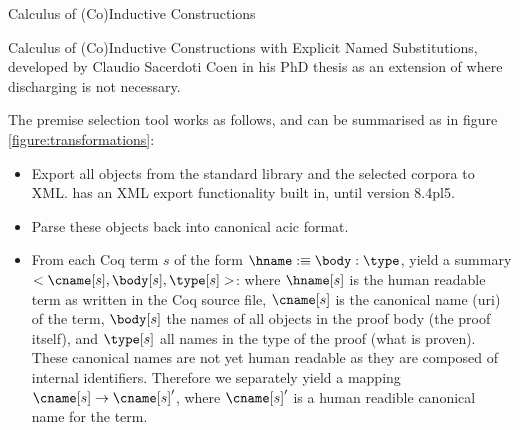 \begin{definition}[\cic]
	Calculus of (Co)Inductive Constructions
\end{definition}

\begin{definition}[\acic]
	Calculus of (Co)Inductive Constructions with Explicit Named Substitutions,
	developed by Claudio Sacerdoti Coen in his PhD thesis \cite{coen2000progettazione}
	as an extension of \cic where discharging is not necessary.
\end{definition}

The premise selection tool works as follows, and can be summarised as in figure \ref{figure:transformations}:
\begin{itemize}
    \item Export all \coq objects from the standard library and the selected corpora to XML.
		\coq has an XML export functionality built in, until version 8.4pl5.
	\item Parse these objects back into canonical \gls{acic} format.
	\item From each Coq term $s$ of the form $\hname :\equiv \body : \type$, yield a summary $<\cname[s], \body[s], \type[s]>$:
		where $\hname[s]$ is the human readable term as written in the Coq source file, $\cname[s]$ is the canonical name (uri) of the term,
		$\body[s]$ the names of all objects in the proof body (the proof itself),
		and $\type[s]$ all names in the type of the proof (what is proven).
		These canonical names are not yet human readable as they are composed of internal identifiers.
		Therefore we separately yield a mapping $\cname[s] \rightarrow \cname[s]'$, where $\cname[s]'$ is a human readible canonical name for the term.
		

\end{itemize}
